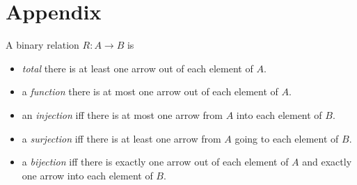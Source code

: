 \documentclass[handout]{mcs}
\begin{document}

\section*{Appendix}

A binary relation $R:A \to B$ is
\begin{itemize}

\item \emph{total} there is at least one arrow out of each element of $A$.

\iffalse
Formally, $\forall a \in A\, \exists  b \in B.\ a\mrel{R}b$.
\fi

\item a \emph{function} there is at most one arrow out of each element of
  $A$.

\iffalse
Formally, $\forall a \in A\, \forall b,c \in B.\ [ a\mrel{R}b
  \QAND a\mrel{R}c] \QIMPLIES b=c$.
\fi

\item an \emph{injection} iff there is at most one arrow from $A$ into
  each element of $B$.

\iffalse
  Formally, $\forall a,a' \in A\, \forall b \in
  B.[\ a \mrel{R} b \QAND a' \mrel{R} b] \QIMPLIES a=a'$.
\fi

\item a \emph{surjection} iff there is at least one arrow from $A$ going
  to each element of $B$.

\iffalse
Formally, $\forall b \in B\, \exists a \in
  A.\ a\mrel{R}b$.
\fi

\item a \emph{bijection} iff there is exactly one arrow out of each
element of $A$ and exactly one arrow into each element of $B$.
\end{itemize}
\end{document}
